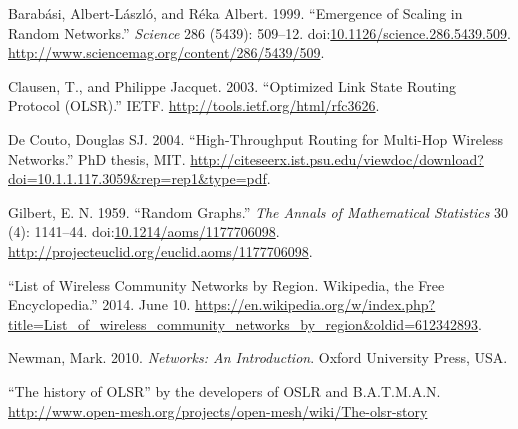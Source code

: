 \documentclass[oneside,openany]{memoir}
\begin{document}
Barabási, Albert-László, and Réka Albert. 1999. ``Emergence of Scaling
in Random Networks.'' \emph{Science} 286 (5439): 509--12.
doi:\href{http://dx.doi.org/10.1126/science.286.5439.509}{10.1126/science.286.5439.509}.
\url{http://www.sciencemag.org/content/286/5439/509}.

Clausen, T., and Philippe Jacquet. 2003. ``Optimized Link State Routing
Protocol (OLSR).'' IETF. \url{http://tools.ietf.org/html/rfc3626}.

De Couto, Douglas {SJ}. 2004. ``High-Throughput Routing for Multi-Hop
Wireless Networks.'' PhD thesis, MIT.
\url{http://citeseerx.ist.psu.edu/viewdoc/download?doi=10.1.1.117.3059\&rep=rep1\&type=pdf}.

Gilbert, E. N. 1959. ``Random Graphs.'' \emph{The Annals of Mathematical
Statistics} 30 (4): 1141--44.
doi:\href{http://dx.doi.org/10.1214/aoms/1177706098}{10.1214/aoms/1177706098}.
\url{http://projecteuclid.org/euclid.aoms/1177706098}.

``List of Wireless Community Networks by Region. Wikipedia, the Free
Encyclopedia.'' 2014. June 10.
\url{https://en.wikipedia.org/w/index.php?title=List_of_wireless_community_networks_by_region\&oldid=612342893}.

Newman, Mark. 2010. \emph{Networks: An Introduction}. Oxford University
Press, USA.

``The history of OLSR'' by the developers of OSLR and B.A.T.M.A.N.
\url{http://www.open-mesh.org/projects/open-mesh/wiki/The-olsr-story}
\end{document}
